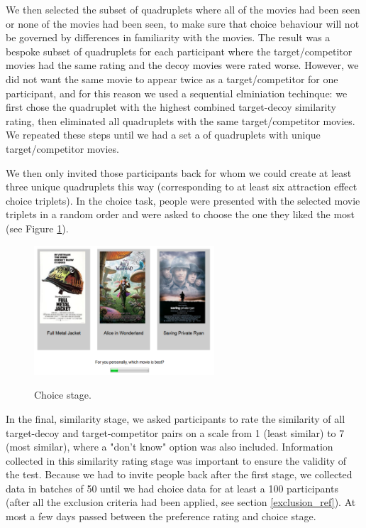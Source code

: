 \documentclass[12pt, a4paper]{article}
\begin{document}
 
 We then selected the subset of quadruplets where all of the movies had been seen or none of the movies had been seen, to make sure that choice behaviour will not be governed by differences in familiarity with the movies. The result was a bespoke subset of quadruplets for each participant where the target/competitor movies had the same rating and the decoy movies were rated worse. However, we did not want the same movie to appear twice as a target/competitor for one participant, and for this reason we used a sequential elminiation techinque: we first chose the quadruplet with the highest combined target-decoy similarity rating, then eliminated all quadruplets with the same target/competitor movies. We repeated these steps until we had a set a of quadruplets with unique target/competitor movies.  
 
  We then only invited those participants back for whom we could create at least three unique quadruplets this way (corresponding to at least six attraction effect choice triplets). In the choice task, people were presented with the selected movie triplets in a random order and were asked to choose the one they liked the most (see Figure \ref{fig:exp1_screenshot}). 
 
\begin{figure}[htb!]
\centering
\captionsetup{justification=centering}
\caption{Choice stage.}
\includegraphics[width=0.6\textwidth]{rsz_exp1_choicestage.png}
\label{fig:exp1_screenshot}
\end{figure}



 In the final, similarity stage, we asked participants to rate the similarity of all target-decoy and target-competitor pairs on a scale from 1 (least similar) to 7 (most similar), where a "don't know" option was also included. Information collected in this similarity rating stage was important to ensure the validity of the test. Because we had to invite people back after the first stage, we collected data in batches of 50 until we had choice data for at least a 100 participants (after all the exclusion criteria had been applied, see section \ref{exclusion_ref}). At most a few days passed between the preference rating and choice stage.
 
\end{document}
